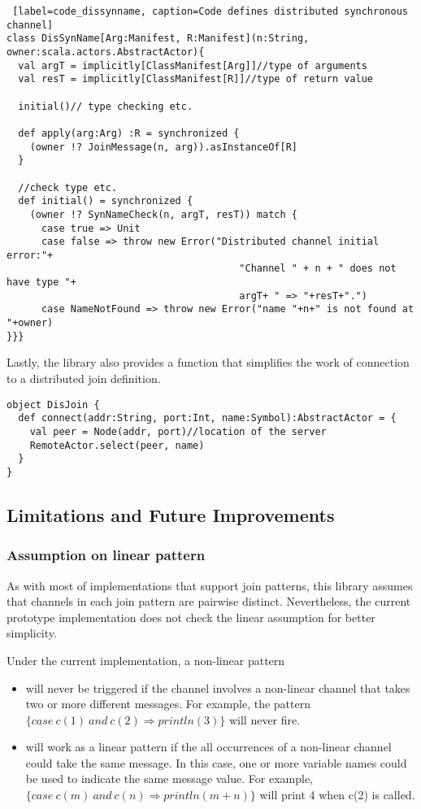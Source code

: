 \begin{lstlisting} [label=code_dissynname, caption=Code defines distributed synchronous channel]
class DisSynName[Arg:Manifest, R:Manifest](n:String, owner:scala.actors.AbstractActor){
  val argT = implicitly[ClassManifest[Arg]]//type of arguments
  val resT = implicitly[ClassManifest[R]]//type of return value
  
  initial()// type checking etc.
  
  def apply(arg:Arg) :R = synchronized {
    (owner !? JoinMessage(n, arg)).asInstanceOf[R]
  }
  
  //check type etc.
  def initial() = synchronized {
    (owner !? SynNameCheck(n, argT, resT)) match {
      case true => Unit
      case false => throw new Error("Distributed channel initial error:"+
                                        "Channel " + n + " does not have type "+
                                        argT+ " => "+resT+".")
      case NameNotFound => throw new Error("name "+n+" is not found at "+owner)
}}}
\end{lstlisting}

Lastly, the library also provides a function that simplifies the work of connection to a distributed join definition.

\begin{lstlisting}
object DisJoin {
  def connect(addr:String, port:Int, name:Symbol):AbstractActor = {
    val peer = Node(addr, port)//location of the server
    RemoteActor.select(peer, name)
  }
}
\end{lstlisting}




\subsection{Limitations and Future Improvements}
\subsubsection{Assumption on linear pattern}
As with most of implementations that support join patterns, this library assumes that channels in each join pattern are pairwise distinct.  Nevertheless, the current prototype implementation does not check the linear assumption for better simplicity.  

Under the current implementation, a non-linear pattern
\begin{itemize}
\item will never be triggered if the channel involves a non-linear channel that takes two or more different messages.  For example, the pattern $\{case\  c(1)\ and\ c(2) \Rightarrow println(3)\}$ will never fire.
\item will work as a linear pattern if the all occurrences of a non-linear channel could take the same message.  In this case, one or more variable names could be used to indicate the same message value.  For example,  $\{case\  c(m)\ and\ c(n) \Rightarrow println(m+n)\}$ will print 4 when c(2) is called.
\end{itemize}

